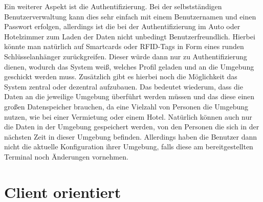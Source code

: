 Ein weiterer Aspekt ist die Authentifizierung. Bei der selbstständigen Benutzerverwaltung kann dies sehr einfach mit einem Benutzernamen und einen Passwort erfolgen, allerdings ist die bei der Authentifizierung im Auto oder Hotelzimmer zum Laden der Daten nicht unbedingt Benutzerfreundlich. Hierbei könnte man natürlich auf Smartcards oder RFID-Tags in Form eines runden Schlüsselanhänger zurückgreifen. Dieser würde dann nur zu Authentifizierung dienen, wodurch das System weiß, welches Profil geladen und an die Umgebung geschickt werden muss. Zusätzlich gibt es hierbei noch die Möglichkeit das System zentral oder dezentral aufzubauen. Das bedeutet wiederum, dass die Daten an die jeweilige Umgebung überführt werden müssen und das diese einen großen Datenspeicher brauchen, da eine Vielzahl von Personen die Umgebung nutzen, wie bei einer Vermietung oder einem Hotel. Natürlich können auch nur die Daten in der Umgebung gespeichert werden, von den Personen die sich in der nächsten Zeit in dieser Umgebung befinden. Allerdings haben die Benutzer dann nicht die aktuelle Konfiguration ihrer Umgebung, falls diese am bereitgestellten Terminal noch Änderungen vornehmen.  

\section{Client orientiert}

